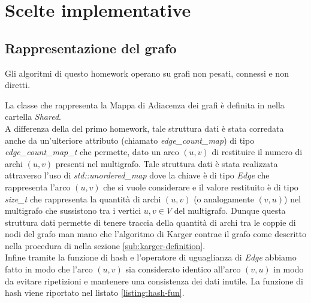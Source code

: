 \section{Scelte implementative}
\label{cap:implementation-choices}

\subsection{Rappresentazione del grafo}
\label{sub:graph-representation}

Gli algoritmi di questo homework operano su grafi non pesati, connessi e non diretti.


\noindent La classe che rappresenta la Mappa di Adiacenza dei grafi è definita in  nella cartella \textit{Shared}.\\

\noindent A differenza della  del primo homework, tale struttura dati è stata corredata anche da un'ulteriore attributo (chiamato \textit{edge\_count\_map}) di tipo \textit{edge\_count\_map\_t} che permette, dato un arco $(u,v)$ di restituire il numero di archi $(u,v)$ presenti nel multigrafo. Tale struttura dati è stata realizzata attraverso l'uso di \textit{std::unordered\_map} dove la chiave è di tipo \textit{Edge} che rappresenta l'arco $(u,v)$ che si vuole considerare e il valore restituito è di tipo \textit{size\_t} che rappresenta la quantità di archi $(u,v)$ (o analogamente $(v,u)$) nel multigrafo che sussistono tra i vertici $u, v \in V$ del multigrafo. Dunque questa struttura dati permette di tenere traccia della quantità di archi tra le coppie di nodi del grafo man mano che l'algoritmo di Karger contrae il grafo come descritto nella procedura di  nella sezione \ref{sub:karger-definition}.\\

\noindent Infine tramite la funzione di hash e l'operatore di uguaglianza di \textit{Edge} abbiamo fatto in modo che l'arco $(u,v)$ sia considerato identico all'arco $(v,u)$ in modo da evitare ripetizioni e mantenere una consistenza dei dati inutile. La funzione di hash viene riportato nel listato \ref{listing:hash-fun}.\\

